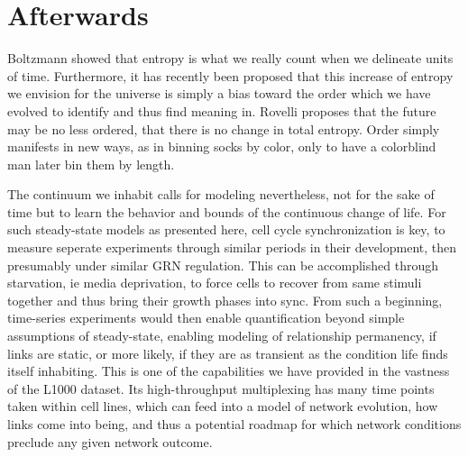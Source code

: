 

\graphicspath{{6/figures/}} %



\chapter{\label{}Afterwards}


Boltzmann showed that entropy is what we really count when we delineate units of time. Furthermore, it has recently been proposed \citep{connes1994neumann} that this increase of entropy we envision for the universe is simply a bias toward the order which we have evolved to identify and thus find meaning in. Rovelli proposes that the future may be no less ordered, that there is no change in total entropy. Order simply manifests in new ways, as in binning socks by color, only to have a colorblind man later bin them by length.

The continuum we inhabit calls for modeling nevertheless, not for the sake of time but to learn the behavior and bounds of the continuous change of life. For such steady-state models as presented here, cell cycle synchronization is key, to measure seperate experiments through similar periods in their development, then presumably under similar GRN regulation. This can be accomplished through starvation, ie media deprivation, to force cells to recover from same stimuli together and thus bring their growth phases into sync. From such a beginning, time-series experiments would then enable quantification beyond simple assumptions of steady-state, enabling modeling of relationship permanency, \ie if links are static, or more likely, if they are as transient as the condition life finds itself inhabiting. This is one of the capabilities we have provided in the vastness of the L1000 dataset. Its high-throughput multiplexing has many time points taken within cell lines, which can feed into a model of network evolution, how links come into being, and thus a potential roadmap for which network conditions preclude any given network outcome.

